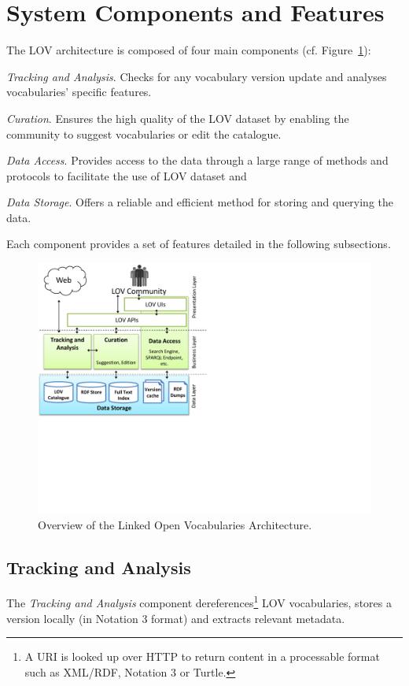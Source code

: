 \documentclass{iosart2c}
\begin{document}
\section{System Components and Features}\label{sec:arch}
	 The LOV architecture is composed of four main components (cf. Figure~\ref{fig:arch}): 
\begin{inparaenum}[1)] 
	\item \emph{Tracking and Analysis}. Checks for any vocabulary version update and analyses vocabularies' specific features.
	\item \emph{Curation}. Ensures the high quality of the LOV dataset by enabling the community to suggest vocabularies or edit the catalogue.
	\item \emph{Data Access}. Provides access to the data through a large range of methods and protocols to facilitate the use of LOV dataset and
	\item \emph{Data Storage}. Offers a reliable and efficient method for storing and querying the data.
\end{inparaenum} 
Each component provides a set of features detailed in the following subsections.


\begin{figure}[ht!b]
\includegraphics[trim={0cm 7cm 0cm 0cm},scale=.6]{lov_architecture.pdf}
\caption{Overview of the Linked Open Vocabularies Architecture.}
\label{fig:arch}
\end{figure}

\subsection{Tracking and Analysis}
	The \emph{Tracking and Analysis} component dereferences\footnote{A URI is looked up over HTTP to return content in a processable format such as XML/RDF, Notation 3 or Turtle.} LOV vocabularies, stores a version locally (in Notation 3 format) and extracts relevant metadata.
\end{document}
